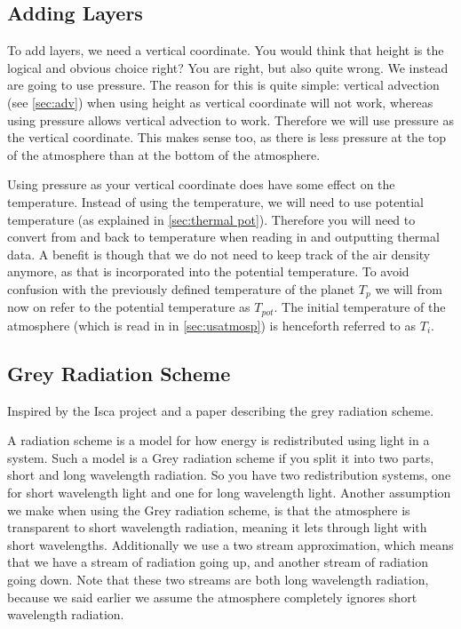 \subsection{Adding Layers} \label{sec:rad layers}
To add layers, we need a vertical coordinate. You would think that height is the logical and obvious choice right? You are right, but also quite wrong. We instead are going to use pressure. The 
reason for this is quite simple: vertical advection (see \autoref{sec:adv}) when using height as vertical coordinate will not work, whereas using pressure allows vertical advection to work.
Therefore we will use pressure as the vertical coordinate. This makes sense too, as there is less pressure at the top of the atmosphere than at the bottom of the atmosphere.

Using pressure as your vertical coordinate does have some effect on the temperature. Instead of using the temperature, we will need to use potential temperature (as explained in 
\autoref{sec:thermal pot}). Therefore you will need to convert from and back to temperature when reading in and outputting thermal data. A benefit is though that we do not need to keep track 
of the air density anymore, as that is incorporated into the potential temperature. To avoid confusion with the previously defined temperature of the planet $T_p$ we will from now on refer to 
the potential temperature as $T_{pot}$. The initial temperature of the atmosphere (which is read in in \autoref{sec:usatmosp}) is henceforth referred to as $T_i$.

\subsection{Grey Radiation Scheme}
Inspired by the Isca project \cite{isca} and a paper describing the grey radiation scheme\cite{greyRad}.

A radiation scheme is a model for how energy is redistributed using light in a system. Such a model is a Grey radiation scheme if you split it into two parts, short and long wavelength radiation.
So you have two redistribution systems, one for short wavelength light and one for long wavelength light. Another assumption we make when using the Grey radiation scheme, is that the atmosphere 
is transparent to short wavelength radiation, meaning it lets through light with short wavelengths. Additionally we use a two stream approximation, which means that we have a stream of radiation
going up, and another stream of radiation going down. Note that these two streams are both long wavelength radiation, because we said earlier we assume the atmosphere completely ignores short 
wavelength radiation.


